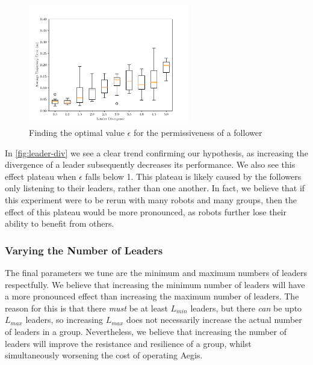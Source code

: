 \begin{figure}
    \centering
    \includegraphics[width=7cm]{report/graphs/leader_divergence_max.pdf}
    \caption{Finding the optimal value $\epsilon$ for the permissiveness of a follower}
    \label{fig:leader-div}
\end{figure}

In \autoref{fig:leader-div} we see a clear trend confirming our hypothesis, as increasing the divergence of a leader subsequently decreases its performance. We also see this effect plateau when $\epsilon$ falls below 1. This plateau is likely caused by the followers only listening to their leaders, rather than one another. In fact, we believe that if this experiment were to be rerun with many robots and many groups, then the effect of this plateau would be more pronounced, as robots further lose their ability to benefit from others.

\subsubsection{Varying the Number of Leaders}
The final parameters we tune are the minimum and maximum numbers of leaders respectfully. We believe that increasing the minimum number of leaders will have a more pronounced effect than increasing the maximum number of leaders. The reason for this is that there \textit{must} be at least $L_{min}$ leaders, but there \textit{can} be upto $L_{max}$ leaders, so increasing $L_{max}$ does not necessarily increase the actual number of leaders in a group. Nevertheless, we believe that increasing the number of leaders will improve the resistance and resilience of a group, whilst simultaneously worsening the cost of operating Aegis.

